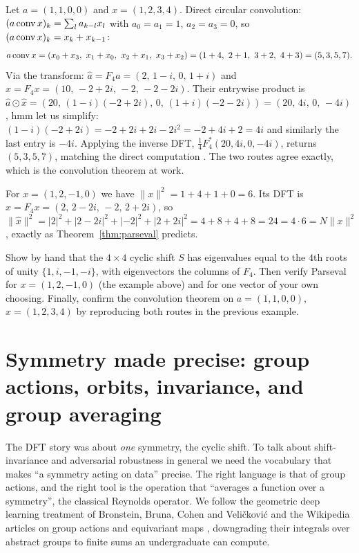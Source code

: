 \begin{example}
Let $a = (1,1,0,0)$ and $x = (1,2,3,4)$. Direct circular convolution: $(a\operatorname{conv} x)_k =
\sum_l a_{k-l} x_l$ with $a_0 = a_1 = 1$, $a_2 = a_3 = 0$, so $(a\operatorname{conv} x)_k = x_k +
x_{k-1}$:
\[
  a \conv x = (x_0 + x_3,\ x_1 + x_0,\ x_2 + x_1,\ x_3 + x_2)
            = (1+4,\ 2+1,\ 3+2,\ 4+3) = (5,3,5,7).
\]
Via the transform: $\widehat a = F_4 a = (2,\,1-i,\,0,\,1+i)$ and $\widehat x = F_4 x =
(10,\,-2+2i,\,-2,\,-2-2i)$. Their entrywise product is $\widehat a \odot \widehat x =
(20,\,(1-i)(-2+2i),\,0,\,(1+i)(-2-2i)) = (20,\,4i,\,0,\,-4i)$, hmm let us simplify:
$(1-i)(-2+2i) = -2+2i+2i-2i^2 = -2+4i+2 = 4i$ and similarly the last entry is $-4i$.
Applying the inverse DFT, $\tfrac14 F_4^\ast(20,4i,0,-4i)$, returns $(5,3,5,7)$,
matching the direct computation \citep{fourier_rutgers}. The two routes agree exactly,
which is the convolution theorem at work.
\end{example}

\begin{example}
For $x = (1,2,-1,0)$ we have $\|x\|^2 = 1 + 4 + 1 + 0 = 6$. Its DFT is $\widehat x = F_4
x = (2,\,2-2i,\,-2,\,2+2i)$, so $\|\widehat x\|^2 = |2|^2 + |2-2i|^2 + |-2|^2 +
|2+2i|^2 = 4 + 8 + 4 + 8 = 24 = 4 \cdot 6 = N\|x\|^2$, exactly as
Theorem~\ref{thm:parseval} predicts.
\end{example}

\begin{problem}
\label{prob:dft}
Show by hand that the $4\times 4$ cyclic shift $S$ has eigenvalues equal to the $4$th
roots of unity $\{1, i, -1, -i\}$, with eigenvectors the columns of $F_4$. Then verify
Parseval for $x = (1,2,-1,0)$ (the example above) and for one vector of your own
choosing. Finally, confirm the convolution theorem on $a = (1,1,0,0)$, $x = (1,2,3,4)$
by reproducing both routes in the previous example.
\end{problem}


\section{Symmetry made precise: group actions, orbits, invariance,
and group averaging}
\label{sec:groups}

The DFT story was about \emph{one} symmetry, the cyclic shift. To talk about
shift-invariance and adversarial robustness in general we need the vocabulary that
makes ``a symmetry acting on data'' precise. The right language is that of group
actions, and the right tool is the operation that ``averages a function over a
symmetry'', the classical Reynolds operator. We follow the geometric deep learning
treatment of Bronstein, Bruna, Cohen and Veli\v{c}kovi\'c \citep{groups_bronstein} and
the Wikipedia articles on group actions and equivariant maps
\citep{wiki_groupaction,wiki_equivariant}, downgrading their integrals over abstract
groups to finite sums an undergraduate can compute.

